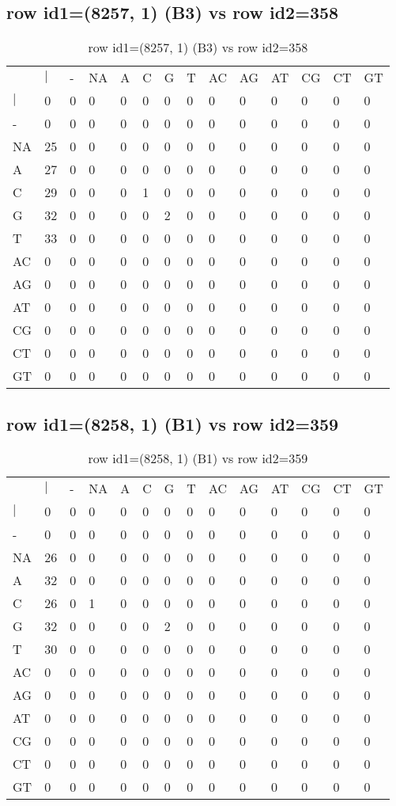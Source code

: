\subsection{row id1=(8257, 1) (B3) vs row id2=358}
\begin{center}
\begin{longtable}{|l|l|l|l|l|l|l|l|l|l|l|l|l|l|}
\caption{row id1=(8257, 1) (B3) vs row id2=358} \label{table_dm400}\\
\hline
\\
\hline
&$|$&-&NA&A&C&G&T&AC&AG&AT&CG&CT&GT\\
$|$&0&0&0&0&0&0&0&0&0&0&0&0&0\\
-&0&0&0&0&0&0&0&0&0&0&0&0&0\\
NA&25&0&0&0&0&0&0&0&0&0&0&0&0\\
A&27&0&0&0&0&0&0&0&0&0&0&0&0\\
C&29&0&0&0&1&0&0&0&0&0&0&0&0\\
G&32&0&0&0&0&2&0&0&0&0&0&0&0\\
T&33&0&0&0&0&0&0&0&0&0&0&0&0\\
AC&0&0&0&0&0&0&0&0&0&0&0&0&0\\
AG&0&0&0&0&0&0&0&0&0&0&0&0&0\\
AT&0&0&0&0&0&0&0&0&0&0&0&0&0\\
CG&0&0&0&0&0&0&0&0&0&0&0&0&0\\
CT&0&0&0&0&0&0&0&0&0&0&0&0&0\\
GT&0&0&0&0&0&0&0&0&0&0&0&0&0\\
\hline
\end{longtable}
\end{center}

\subsection{row id1=(8258, 1) (B1) vs row id2=359}
\begin{center}
\begin{longtable}{|l|l|l|l|l|l|l|l|l|l|l|l|l|l|}
\caption{row id1=(8258, 1) (B1) vs row id2=359} \label{table_dm402}\\
\hline
\\
\hline
&$|$&-&NA&A&C&G&T&AC&AG&AT&CG&CT&GT\\
$|$&0&0&0&0&0&0&0&0&0&0&0&0&0\\
-&0&0&0&0&0&0&0&0&0&0&0&0&0\\
NA&26&0&0&0&0&0&0&0&0&0&0&0&0\\
A&32&0&0&0&0&0&0&0&0&0&0&0&0\\
C&26&0&1&0&0&0&0&0&0&0&0&0&0\\
G&32&0&0&0&0&2&0&0&0&0&0&0&0\\
T&30&0&0&0&0&0&0&0&0&0&0&0&0\\
AC&0&0&0&0&0&0&0&0&0&0&0&0&0\\
AG&0&0&0&0&0&0&0&0&0&0&0&0&0\\
AT&0&0&0&0&0&0&0&0&0&0&0&0&0\\
CG&0&0&0&0&0&0&0&0&0&0&0&0&0\\
CT&0&0&0&0&0&0&0&0&0&0&0&0&0\\
GT&0&0&0&0&0&0&0&0&0&0&0&0&0\\
\hline
\end{longtable}
\end{center}

